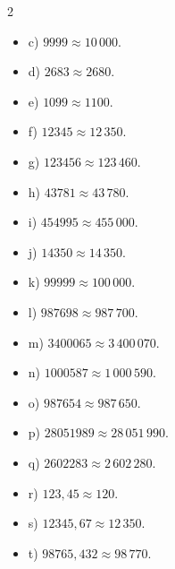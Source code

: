 \begin{bt}
{\begin{multicols}{2}
\begin{itemize}
			\item c) $9999 \approx 10\,000$.
			\item d) $2683 \approx 2680$.
			\item e) $1099 \approx 1100$.
			\item f) $12345 \approx 12\,350$.
			\item g) $123456 \approx 123\,460$.
			\item h) $43781 \approx 43\,780$.
			\item i) $454995 \approx 455\,000$.
			\item j) $14350 \approx 14\,350$.
			\item k) $99999 \approx 100\,000$.
			\item l) $987698 \approx 987\,700$.
			\item m) $3400065 \approx 3\,400\,070$.
			\item n) $1000587 \approx 1\,000\,590$.
			\item o) $987654 \approx 987\,650$.
			\item p) $28051989 \approx 28\,051\,990$.
			\item q) $2602283 \approx 2\,602\,280$.
			\item r) $123{,}45 \approx 120$.
			\item s) $12345{,}67 \approx 12\,350$.
			\item t) $98765{,}432 \approx 98\,770$.
		\end{itemize}
		\end{multicols}
	}
\end{bt}

